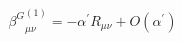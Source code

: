 \begin{equation}
{\beta^G}^{(1)}_{\mu\nu}=-\alpha^\prime
R_{\mu\nu}+O(\alpha^\prime)
\end{equation}

